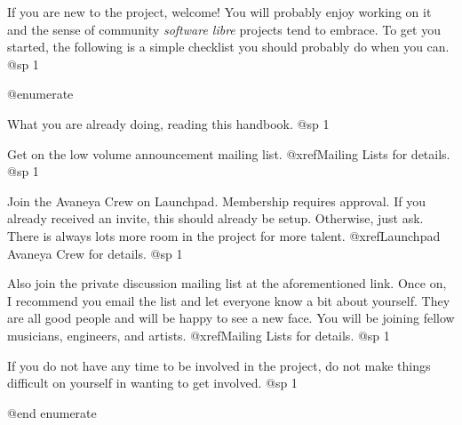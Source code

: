 
If you are new to the project, welcome! You will probably enjoy working on it and the sense of community {\it software libre} projects tend to embrace. To get you started, the following is a simple checklist you should probably do when you can.
@sp 1

@enumerate

\item
What you are already doing, reading this handbook.
@sp 1

\item
Get on the low volume announcement mailing list. @xref{Mailing Lists} for details.
@sp 1

\item
Join the Avaneya Crew on Launchpad. Membership requires approval. If you already received an invite, this should already be setup. Otherwise, just ask. There is always lots more room in the project for more talent. @xref{Launchpad Avaneya Crew} for details.
@sp 1

\item
Also join the private discussion mailing list at the aforementioned link. Once on, I recommend you email the list and let everyone know a bit about yourself. They are all good people and will be happy to see a new face. You will be joining fellow musicians, engineers, and artists. @xref{Mailing Lists} for details.
@sp 1

\item
If you do not have any time to be involved in the project, do not make things difficult on yourself in wanting to get involved.
@sp 1

@end enumerate

